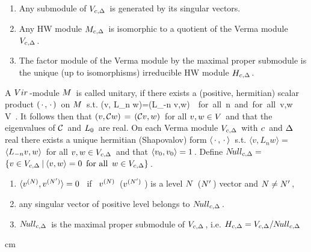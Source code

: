  \renewcommand{\labelenumi}{(\roman{enumi})}
 \begin{enumerate}
 \item Any submodule of \s$V_{c,\Delta}\hspace{0.05cm}$ is generated by
       its singular vectors.
 \item Any HW module \s$M_{c,\Delta}\hspace{0.05cm}$ is isomorphic
       to a quotient of the Verma module \s$V_{c,\Delta}\hspace{0.05cm}$.
 \item The factor module of the Verma module by the maximal proper
       submodule is the unique (up to isomorphisms)
       irreducible HW module \s$H_{c,\Delta}\hspace{0.05cm}$.
 \end{enumerate}

\vs 0.4cm


A \s$Vir\hspace{0.05cm}$-module \s$M\hspace{0.05cm}$ is called unitary, if there exists
a (positive, hermitian) scalar product \s$(\hspace{0.05cm}\cdot\hspace{0.05cm},\hspace{0.05cm}\cdot\hspace{0.05cm})\hspace{0.05cm}$
on  \s$M\hspace{0.05cm}$ s.\s t.
\qq
 (v, L_n w)\s=\s(L_{-n} v,w)\ \ {\rm for\ all}\ n\in\NZ\ {\rm and\
for\ all}\ \s v,w \in V\ .
\label{Unita}
\qqq
It follows then that \s$( v, {\cal C} w )\hspace{0.05cm} =\hspace{0.05cm}( {\cal C} v,w)\hspace{0.05cm}$
for all \s$v,w \in V\hspace{0.05cm}$ and that the eigenvalues of \s${\cal C}\hspace{0.05cm}$
and \s$L_0\hspace{0.05cm}$ are real. \s On each Verma module
\s$V_{c,\Delta}\hspace{0.05cm}$ with \s$c\hspace{0.05cm}$ and \s$\Delta\hspace{0.05cm}$ real
there exists a unique hermitian (Shapovalov) form
\s$\langle\, \cdot\, ,\, \cdot\,\rangle\hspace{0.05cm}$ s.\s t.
\s$\langle v,L_n w\rangle =$$\langle L_{-n} v,w \rangle\hspace{0.05cm}$
for all \s$v,w \in V_{c,\Delta}\hspace{0.05cm}$ and that
\s$\langle v_0 ,v_0 \rangle =1\hspace{0.05cm}$.
\s Define \s$N\!ull_{c,\Delta} =\hspace{0.05cm}$ \s$\left\{ v\in
V_{c,\Delta}\s\m |\s\m \langle v ,w \rangle = 0\ \s{\rm for\ all}
\ \s w\in V_{c,\Delta}\right\}\s$.
\vs 0.5cm


\renewcommand{\labelenumi}{(\roman{enumi})}
 \begin{enumerate}
  \item \s$ \langle v^{(N)},v^{(N')} \rangle = 0 \ \s$ if
	 \ \s$v^{(N)}\hspace{0.05cm}$ (\s$v^{(N')}\s\s$)
	 is a level \s$N\hspace{0.05cm}$ (\s$N'\hspace{0.05cm}$)
	 vector and \s$N\not= N'\hspace{0.05cm}$,
  \item  any singular vector of positive level belongs
	 to \s$N\!ull_{c,\Delta}\hspace{0.05cm}$.
  \item  \s$N\!ull_{c,\Delta}\hspace{0.05cm}$ is the
	 maximal proper submodule
	 of \s$V_{c,\Delta}\hspace{0.05cm}$, \s i.\s e.
	 \s$H_{c,\Delta} = V_{c,\Delta}/N\!ull_{c,\Delta}\hspace{0.05cm}$
 \end{enumerate}

 cm


